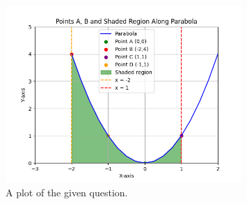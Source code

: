 \documentclass[journal]{IEEEtran}
\numberwithin{equation}{enumi}
\numberwithin{figure}{enumi}
\begin{document}
\begin{figure}[h]
	\centering
	\includegraphics[width=0.8\textwidth]{figs/fig.png}
	\caption{A plot of the given question.}
\end{figure}
\end{document}
